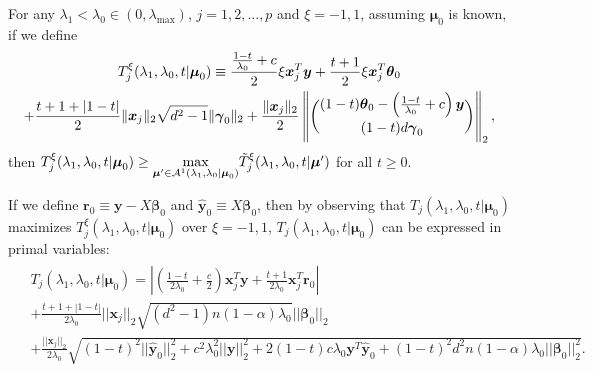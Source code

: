 \begin{theorem}
    \label{thm:2.1}
    For any $\lambda_1<\lambda_{0}\in (0,\lambda_\textrm{max})$, $j=1,2,...,p$ and $\xi=-1,1$, assuming $\boldsymbol\mu_0$ is known, if we define
    \begin{align}
        \begin{gathered}
            T^\xi_j(\lambda_1,\lambda_0,t|\boldsymbol\mu_0)\equiv\frac{\frac{1-t}{\lambda_0}+c}{2}\xi\boldsymbol x_j^T \boldsymbol y+\frac{t+1}{2}\xi \boldsymbol x_j^T \boldsymbol \theta_{0}\\+\frac{t+1+|1-t|}{2}\lVert\boldsymbol x_j\rVert_2\sqrt{d^2-1}\lVert\boldsymbol\gamma_{0}\rVert_2+\frac{\lVert\boldsymbol x_j\rVert_2}{2}\left\Vert\binom{(1-t)\boldsymbol\theta_{0}-\left(\frac{1-t}{\lambda_0}+c\right)\boldsymbol y}{(1-t)d\boldsymbol\gamma_{0}}\right\Vert_2,
        \end{gathered}
    \end{align}
    then $T^\xi_j(\lambda_1,\lambda_0,t|\boldsymbol\mu_0)\geq\underset{\boldsymbol\mu'\in\mathcal{A}^1(\lambda_1,\lambda_0|\boldsymbol\mu_0)}{\mathrm{max}}\Tilde{T}^\xi_j(\lambda_1,\lambda_0,t|\boldsymbol\mu')$ for all $t\geq0$.
\end{theorem}

If we define $\boldsymbol r_0\equiv \boldsymbol y-X\boldsymbol\beta_{0}$ and $\hat{\boldsymbol y}_{0}\equiv X\boldsymbol\beta_{0}$, then by observing that $T_j(\lambda_1,\lambda_0,t|\boldsymbol\mu_0)$ maximizes $T_j^\xi(\lambda_1,\lambda_0,t|\boldsymbol\mu_0)$ over $\xi=-1,1$, $T_j(\lambda_1,\lambda_0,t|\boldsymbol\mu_0)$ can be expressed in primal variables:
\begin{gather}
    \label{eq:t}
    \begin{aligned}
        &T_j(\lambda_1,\lambda_0,t|\boldsymbol\mu_0)= \left| \left(\frac{1-t}{2\lambda_0}+\frac{c}{2}\right)\boldsymbol x_j^T \boldsymbol y+\frac{t+1}{2\lambda_0} \boldsymbol x_j^T \boldsymbol r_{0}\right|\\
        &+\frac{t+1+|1-t|}{2\lambda_0}||\boldsymbol x_j||_2\sqrt{(d^2-1)n(1-\alpha)\lambda_0 }||\boldsymbol\beta_{0}||_2\\
        &+\frac{||\boldsymbol x_j||_2}{2\lambda_0}\sqrt{(1-t)^2||\hat{\boldsymbol y}_{0}||_2^2+c^2\lambda_0^2||\boldsymbol y||_2^2+2(1-t)c\lambda_0 \boldsymbol y^T\hat{\boldsymbol y}_{0}+(1-t)^2d^2n(1-\alpha)\lambda_0||\boldsymbol\beta_{0}||_2^2}.
    \end{aligned}
\end{gather}

